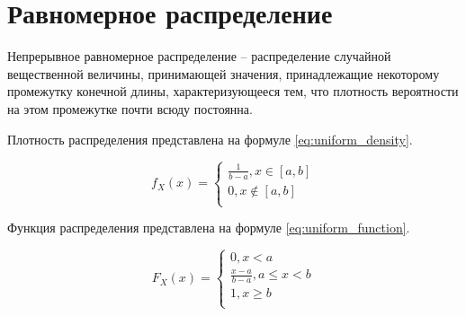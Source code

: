 \section{Равномерное распределение}

Непрерывное равномерное распределение -- распределение случайной вещественной величины, принимающей значения, принадлежащие некоторому промежутку конечной длины, характеризующееся тем, что плотность вероятности на этом промежутке почти всюду постоянна.

Плотность распределения представлена на формуле \ref{eq:uniform_density}.

\begin{equation}\label{eq:uniform_density}
    f_X (x) =
    \begin{cases}
        \frac{1}{b-a}, x \in [a,b] \\
        0, x \notin [a, b] \\
    \end{cases}
\end{equation}

Функция распределения представлена на формуле \ref{eq:uniform_function}.

\begin{equation}\label{eq:uniform_function}
    F_X (x) =
    \begin{cases}
        0, x < a \\
        \frac{x - a}{b - a}, a \le x < b \\
        1, x \geq b \\
    \end{cases}
\end{equation}
